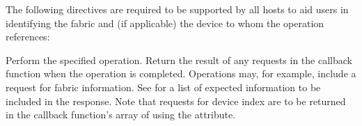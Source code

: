 \reqattrstart
The following directives are required to be supported by all hosts to aid users in identifying the fabric and (if applicable) the device to whom the operation references:


\reqattrend

\descr

Perform the specified operation. Return the result of any requests in the callback function when the operation is completed. Operations may, for example, include a request for fabric information. See  for a list of expected information to be included in the response. Note that requests for device index are to be returned in the callback function's array of  using the  attribute.

